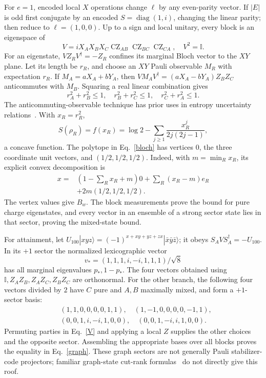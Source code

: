 \documentclass[aps,prl,reprint,nofootinbib]{revtex4-2}
\newcommand{\Id}{\mathbb I}
\newcommand{\CZ}{\operatorname{CZ}}
\begin{document}
For $e=1$, encoded local $X$ operations change $\ell$ by any even-parity
vector. If $|E|$ is odd first conjugate by an encoded
$S=\operatorname{diag}(1,i)$, changing the linear parity; then reduce to
$\ell=(1,0,0)$. Up to a sign and local unitary, every block is an
eigenspace of
\begin{equation}
 V=iX_AX_BX_C\CZ_{AB}\CZ_{BC}\CZ_{CA},\quad V^2=\Id.
 \label{V}
\end{equation}
For an eigenstate, $VZ_RV^\dagger=-Z_R$ confines its marginal Bloch
vector to the $XY$ plane. Let its length be $r_R$, and choose an $XY$
Pauli observable $M_R$ with expectation $r_R$. If $M_A=aX_A+bY_A$,
then $VM_AV^\dagger=(aX_A-bY_A)Z_BZ_C$ anticommutes with $M_B$.
Squaring a real linear combination gives
\begin{equation}
 r_A^2+r_B^2\le1,\quad r_B^2+r_C^2\le1,\quad
 r_C^2+r_A^2\le1.
 \label{bloch}
\end{equation}
The anticommuting-observable technique has prior uses in entropy
uncertainty relations~\cite{WehnerWinter}. With $x_R=r_R^2$,
\begin{equation}
 S(\rho_R)=f(x_R)=\log2-\sum_{j\ge1}\frac{x_R^j}{2j(2j-1)},
 \label{concavity}
\end{equation}
a concave function. The polytope in Eq.~\eqref{bloch} has vertices $0$,
the three coordinate unit vectors, and $(1/2,1/2,1/2)$. Indeed, with
$m=\min_Rx_R$, its explicit convex decomposition is
\begin{align}
 x={}&(1-\textstyle\sum_Rx_R+m)0+\sum_R(x_R-m)e_R\nonumber\\
     &+2m(1/2,1/2,1/2).
 \label{convex}
\end{align}
The vertex values give $B_w$. The block measurements prove the bound for
pure charge eigenstates, and every vector in an ensemble of a strong
sector state lies in that sector, proving the mixed-state bound.

For attainment, let
$U_{100}|xyz\rangle=(-1)^{x+xy+yz+zx}|\bar x\bar y\bar z\rangle$;
it obeys $S_AVS_A^\dagger=-U_{100}$. In its $+1$ sector the normalized
lexicographic vector
\begin{equation}
 v_*=(1,1,1,i,-i,1,1,1)/\sqrt8
 \label{balanced}
\end{equation}
has all marginal eigenvalues $p_*,1-p_*$. The four vectors obtained using
$\Id,Z_AZ_B,Z_AZ_C,Z_BZ_C$ are orthonormal. For the other branch, the
following four vectors divided by $2$ have $C$ pure and $A,B$ maximally
mixed, and form a $+1$-sector basis:
\begin{align}
 &(1,1,0,0,0,0,1,1),\quad(1,-1,0,0,0,0,-1,1),\nonumber\\
 &(0,0,1,i,-i,1,0,0),\quad(0,0,1,-i,i,1,0,0).
 \label{bellbasis}
\end{align}
Permuting parties in Eq.~\eqref{V} and applying a local $Z$ supplies the
other choices and the opposite sector. Assembling the appropriate bases
over all blocks proves the equality in Eq.~\eqref{graph}. These graph
sectors are not generally Pauli stabilizer-code projectors; familiar
graph-state cut-rank formulas~\cite{Hein} do not directly give this roof.
\end{document}
